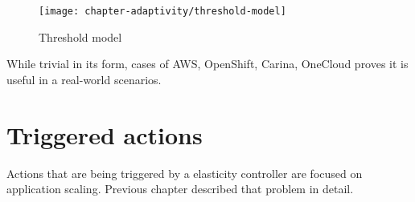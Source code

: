\begin{figure}[!ht]
  \begin{center}
    \texttt{[image: chapter-adaptivity/threshold-model]}
  \end{center}
  \caption{Threshold model}
  \label{fig:threshold-model}
\end{figure}

While trivial in its form, cases of AWS, OpenShift, Carina, OneCloud proves it is useful in a real-world scenarios. 

\section{Triggered actions}
Actions that are being triggered by a elasticity controller are focused on application scaling. Previous chapter described that problem in detail.



